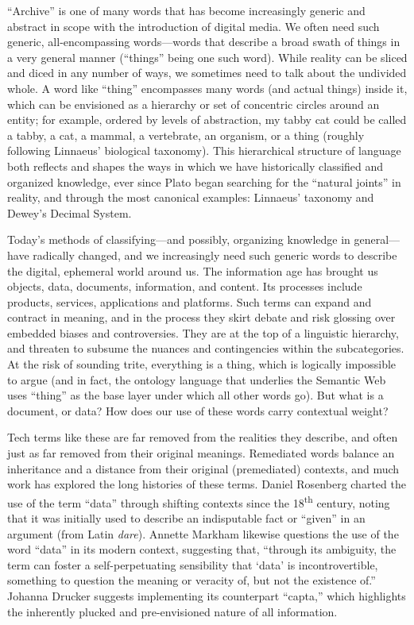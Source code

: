 ``Archive'' is one of many words that has become increasingly generic and abstract in scope with the introduction of digital media. We often need such generic, all-encompassing words---words that describe a broad swath of things in a very general manner (``things'' being one such word). While reality can be sliced and diced in any number of ways, we sometimes need to talk about the undivided whole. A word like ``thing'' encompasses many words (and actual things) inside it, which can be envisioned as a hierarchy or set of concentric circles around an entity; for example, ordered by levels of abstraction, my tabby cat could be called a tabby, a cat, a mammal, a vertebrate, an organism, or a thing (roughly following Linnaeus' biological taxonomy). This hierarchical structure of language both reflects and shapes the ways in which we have historically classified and organized knowledge, ever since Plato began searching for the ``natural joints'' in reality, and through the most canonical examples: Linnaeus' taxonomy and Dewey's Decimal System.

Today's methods of classifying---and possibly, organizing knowledge in general---have radically changed, and we increasingly need such generic words to describe the digital, ephemeral world around us. The information age has brought us objects, data, documents, information, and content. Its processes include products, services, applications and platforms. Such terms can expand and contract in meaning, and in the process they skirt debate and risk glossing over embedded biases and controversies. They are at the top of a linguistic hierarchy, and threaten to subsume the nuances and contingencies within the subcategories. At the risk of sounding trite, everything is a thing, which is logically impossible to argue (and in fact, the ontology language that underlies the Semantic Web uses ``thing'' as the base layer under which all other words go). But what is a document, or data? How does our use of these words carry contextual weight?

Tech terms like these are far removed from the realities they describe, and often just as far removed from their original meanings. Remediated words balance an inheritance and a distance from their original (premediated) contexts, and much work has explored the long histories of these terms. Daniel Rosenberg charted the use of the term ``data'' through shifting contexts since the 18\textsuperscript{th} century, noting that it was initially used to describe an indisputable fact or ``given'' in an argument (from Latin \emph{dare}).\autocite[15-40]{rosenberg_data_2013}  Annette Markham likewise questions the use of the word ``data'' in its modern context, suggesting that, ``through its ambiguity, the term can foster a self-perpetuating sensibility that `data' is incontrovertible, something to question the meaning or veracity of, but not the existence of.''\autocite{markham_undermining_2013} Johanna Drucker suggests implementing its counterpart ``capta,'' which highlights the inherently plucked and pre-envisioned nature of all information.\autocite{drucker_humanities_2011}


